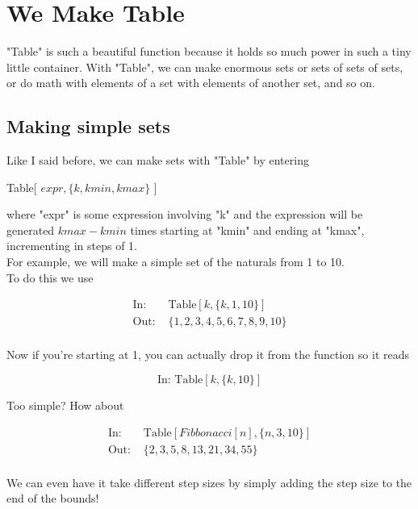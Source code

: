 \documentclass[11pt,letterpaper,twoside,titlepage]{report}
\begin{document}
		\chapter{We Make Table}
		
		 	"Table" is such a beautiful function because it holds so much power in such a tiny little container.  With "Table", we can make enormous sets or sets of sets of sets, or do math with elements of a set with elements of another set, and so on.
			
			\section{Making simple sets}
				
				Like I said before, we can make sets with "Table" by entering
				
				\begin{center} Table[ $ expr, \{ k,kmin,kmax \} $ ] \end{center}
				
				where "expr" is some expression involving "k" and the expression will be generated $ kmax - kmin $ times starting at "kmin" and ending at "kmax", incrementing in steps of 1. \\
				
				For example, we will make a simple set of the naturals from 1 to 10. \\
				
				To do this we use
				
				\begin{align*}
					\text{In: }& \text{Table} [ k , \{ k,1,10 \} ] \\
					\text{Out: }& \{1,2,3,4,5,6,7,8,9,10\} \\
				\end{align*}
				
				Now if you're starting at 1, you can actually drop it from the function so it reads

				\[ \text{In: } \text{Table} [ k , \{ k,10 \} ] \]
				
				Too simple?  How about
				
				\begin{align*}
					\text{In: }& \text{Table} [ Fibbonacci[n] , \{ n,3,10 \} ] \\
					\text{Out: }& \{2,3,5,8,13,21,34,55\} \\
				\end{align*}
				
				We can even have it take different step sizes by simply adding the step size to the end of the bounds!
				
\end{document}
